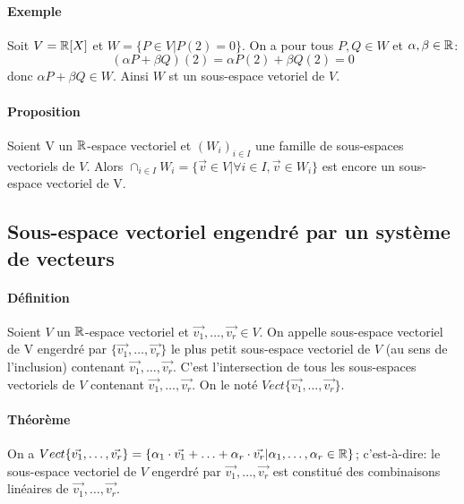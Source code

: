 \paragraph{Exemple} Soit $V=\mathbb{R}[X]$ et $W=\lbrace P \in V | P(2)=0\rbrace$.
On a pour tous $P, Q \in W$ et $\alpha, \beta \in \mathbb{R}$: $$(\alpha P + \beta Q)(2)=\alpha P(2) + \beta Q(2)=0$$ donc $\alpha P + \beta Q \in W$. Ainsi $W$ st un sous-espace vetoriel de $V$.

\paragraph{Proposition} Soient V un $\mathbb{R}$-espace vectoriel et $(W_i)_{i \in I}$ une famille de sous-espaces vectoriels de $V$. Alors $\cap_{i \in I} W_i = \{ \vec{v} \in V | \forall i \in I, \vec{v} \in W_i\}$ est encore un sous-espace vectoriel de V.

%
\subsection{Sous-espace vectoriel engendré par un système de vecteurs}
%
\paragraph{Définition} Soient $V$ un $\mathbb{R}$-espace vectoriel et $\vec{v_1}, \ldots, \vec{v_r} \in V$. On appelle sous-espace vectoriel de V engerdré par $\{\vec{v_1}, \ldots, \vec{v_r}\}$ le plus petit sous-espace vectoriel de $V$ (au sens de l'inclusion) contenant $\vec{v_1}, \ldots, \vec{v_r}$. C'est l'intersection de tous les sous-espaces vectoriels de $V$ contenant $\vec{v_1}, \ldots, \vec{v_r}$. On le noté $Vect\{\vec{v_1}, \ldots, \vec{v_r}\}$.

\paragraph{Théorème} On a $Vect\{\vec{v_1}, \ldots, \vec{v_r}\} = \{\alpha_1 \cdot \vec{v_1} + \ldots + \alpha_r \cdot \vec{v_r} | \alpha_1, \ldots, \alpha_r \in \mathbb{R} \}$; c'est-à-dire: le sous-espace vectoriel de $V$ engerdré par $\vec{v_1}, \ldots, \vec{v_r}$ est constitué des combinaisons linéaires de $\vec{v_1}, \ldots, \vec{v_r}$.
